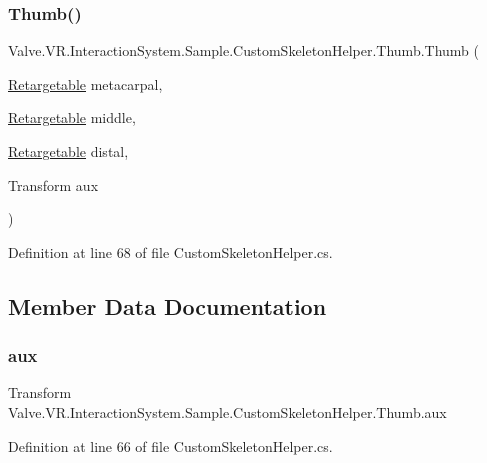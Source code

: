 \subsubsection{\texorpdfstring{Thumb()}{Thumb()}}
{\footnotesize\ttfamily Valve.\+V\+R.\+Interaction\+System.\+Sample.\+Custom\+Skeleton\+Helper.\+Thumb.\+Thumb (\begin{DoxyParamCaption}\item[{\mbox{\hyperlink{class_valve_1_1_v_r_1_1_interaction_system_1_1_sample_1_1_custom_skeleton_helper_1_1_retargetable}{Retargetable}}}]{metacarpal,  }\item[{\mbox{\hyperlink{class_valve_1_1_v_r_1_1_interaction_system_1_1_sample_1_1_custom_skeleton_helper_1_1_retargetable}{Retargetable}}}]{middle,  }\item[{\mbox{\hyperlink{class_valve_1_1_v_r_1_1_interaction_system_1_1_sample_1_1_custom_skeleton_helper_1_1_retargetable}{Retargetable}}}]{distal,  }\item[{Transform}]{aux }\end{DoxyParamCaption})}



Definition at line 68 of file Custom\+Skeleton\+Helper.\+cs.



\subsection{Member Data Documentation}
\mbox{\label{class_valve_1_1_v_r_1_1_interaction_system_1_1_sample_1_1_custom_skeleton_helper_1_1_thumb_ab8f9e9e193f6f7dd690395785d47c577}} 
\subsubsection{\texorpdfstring{aux}{aux}}
{\footnotesize\ttfamily Transform Valve.\+V\+R.\+Interaction\+System.\+Sample.\+Custom\+Skeleton\+Helper.\+Thumb.\+aux}



Definition at line 66 of file Custom\+Skeleton\+Helper.\+cs.

\mbox{\label{class_valve_1_1_v_r_1_1_interaction_system_1_1_sample_1_1_custom_skeleton_helper_1_1_thumb_a1d105532ec423af7ee332b7b8e857c8d}} 
